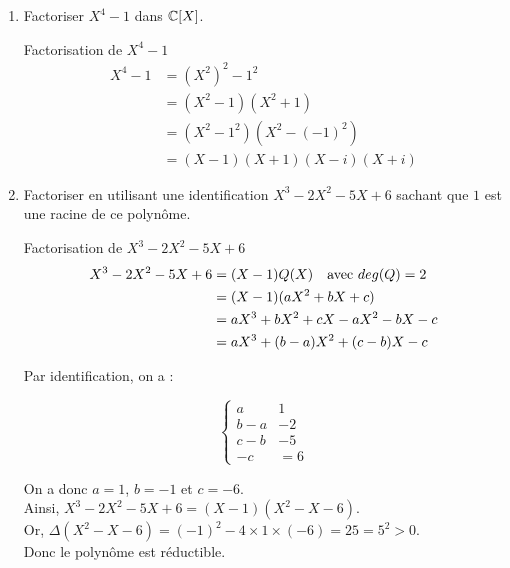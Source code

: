 \begin{enumerate}
    \item Factoriser $X^4 - 1$ dans $\mathbb{C}[X]$.

    \begin{theorem}[black]{Factorisation de $X^4 - 1$}
        \begin{align*}
            X^4 - 1 &= (X^2)^2 - 1^2 \\
            &= (X^2 - 1)(X^2 + 1) \\
            &= (X^2 - 1^2)(X^2 - (-1)^2) \\
            &= (X - 1)(X + 1)(X - i)(X + i)
        \end{align*}
    \end{theorem}
    
    \item Factoriser en utilisant une identification $X^3 - 2X^2 - 5X + 6$ sachant que $1$ est une racine de ce polynôme.

    \begin{theorem}[black]{Factorisation de $X^3 - 2X^2 - 5X + 6$}
        \begin{align*}
            X^3 - 2X^2 - 5X + 6 &= (X - 1)Q(X) \hspace{10px} \text{avec } deg(Q) = 2 \\
            &= (X - 1)(aX^2 + bX + c) \\
            &= aX^3 + bX^2 + cX - aX^2 - bX - c \\
            &= aX^3 + (b - a)X^2 + (c - b)X - c
        \end{align*}

        \noindent Par identification, on a :

        $$
            \left\{
                \begin{array}{ll}
                    a & 1 \\
                    b - a & -2 \\
                    c - b & -5 \\
                    -c &= 6
                \end{array}
            \right.
        $$

        \noindent On a donc $a = 1$, $b = -1$ et $c = -6$. \\
        Ainsi, $X^3 - 2X^2 - 5X + 6 = (X - 1)(X^2 - X - 6)$. \\
        Or, $\Delta(X^2 - X - 6) = (-1)^2 - 4 \times 1 \times (-6) = 25 = 5^2 > 0$. \\
        Donc le polynôme est réductible. \\
        

\end{theorem}
\end{enumerate}
